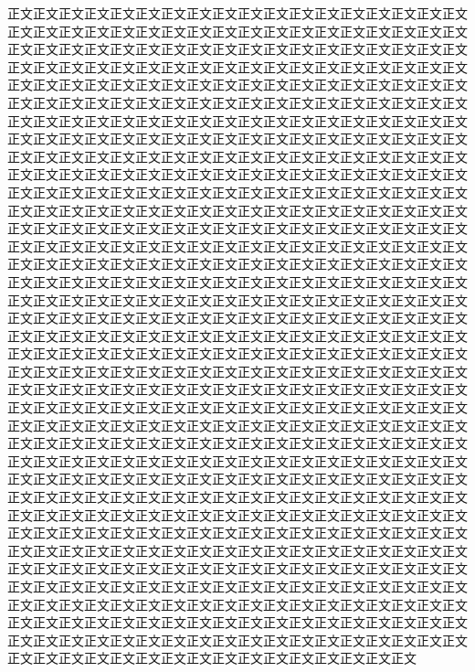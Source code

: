 正文正文正文正文正文正文正文正文正文正文正文正文正文正文正文正文正文正文正文正文正文正文正文正文正文正文正文正文正文正文正文正文正文正文正文正文正文正文正文正文正文正文正文正文正文正文正文正文正文正文正文正文正文正文正文正文正文正文正文正文正文正文正文正文正文正文正文正文正文正文正文正文正文正文正文正文正文正文正文正文正文正文正文正文正文正文正文正文正文正文正文正文正文正文正文正文正文正文正文正文正文正文正文正文正文正文正文正文正文正文正文正文正文正文正文正文正文正文正文正文正文正文正文正文正文正文正文正文正文正文正文正文正文正文正文正文正文正文正文正文正文正文正文正文正文正文正文正文正文正文正文正文正文正文正文正文正文正文正文正文正文正文正文正文正文正文正文正文正文正文正文正文正文正文正文正文正文正文正文正文正文正文正文正文正文正文正文正文正文正文正文正文正文正文正文正文正文正文正文正文正文正文正文正文正文正文正文正文正文正文正文正文正文正文正文正文正文正文正文正文正文正文正文正文正文正文正文正文正文正文正文正文正文正文正文正文正文正文正文正文正文正文正文正文正文正文正文正文正文正文正文正文正文正文正文正文正文正文正文正文正文正文正文正文正文正文正文正文正文正文正文正文正文正文正文正文正文正文正文正文正文正文正文正文正文正文正文正文正文正文正文正文正文正文正文正文正文正文正文正文正文正文正文正文正文正文正文正文正文正文正文正文正文正文正文正文正文正文正文正文正文正文正文正文正文正文正文正文正文正文正文正文正文正文正文正文正文正文正文正文正文正文正文正文正文正文正文正文正文正文正文正文正文正文正文正文正文正文正文正文正文正文正文正文正文正文正文正文正文正文正文正文正文正文正文正文正文正文正文正文正文正文正文正文正文正文正文正文正文正文正文正文正文正文正文正文正文正文正文正文正文正文正文正文正文正文正文正文正文正文正文正文正文正文正文正文正文正文正文正文正文正文正文正文正文正文正文正文正文正文正文正文正文正文正文正文正文正文正文正文正文正文正文正文正文正文正文正文正文正文正文正文正文正文正文正文正文正文正文正文正文正文正文正文正文正文正文正文正文正文正文正文正文正文正文正文正文正文正文正文正文正文正文正文正文正文正文正文正文正文正文正文正文正文正文正文正文正文正文正文正文正文正文正文正文正文正文正文正文正文正文正文正文正文正文正文正文正文正文正文正文正文正文正文正文正文正文正文正文正文正文正文正文正文正文正文正文正文正文正文正文正文正文正文正文正文正文正文正文正文正文正文正文正文正文正文正文正文正文正文正文正文正文正文正文正文正文正文正文正文正文正文正文正文正文正文正文正文正文正文正文正文正文正文正文正文正文正文正文正文正文正文正文正文正文正文正文正文正文正文正文正文正文正文正文正文正文正文正文正文正文正文正文正文正文正文正文正文正文正文正文正文正文正文正文正文正文正文正文正文正文正文正文正文正文正文正文正文正文正文正文正文正文正文正文正文正文正文正文正文正文正文正文正文正文正文正文正文正文正文正文正文正文正文